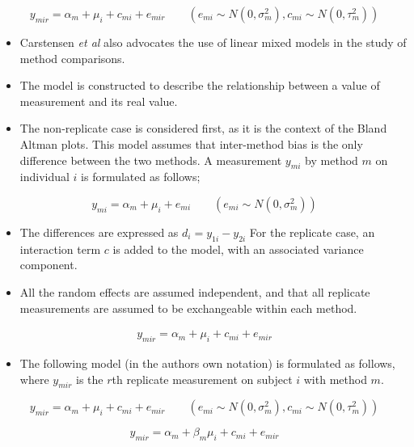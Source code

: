 \documentclass{report}
\begin{document}
\begin{equation}
	y_{mir}  = \alpha_{m} + \mu_{i} + c_{mi} + e_{mir} \qquad ( e_{mi}
	\sim N(0,\sigma^{2}_{m}), c_{mi} \sim N(0,\tau^{2}_{m}))
\end{equation}


%
\large
\begin{itemize}
	\item Carstensen \textit{et al} \cite{BXC2004} also advocates the use of linear mixed models in
	the study of method comparisons. 
	\item The model is constructed to
	describe the relationship between a value of measurement and its
	real value.
	\item  The non-replicate case is considered first, as it is
	the context of the Bland Altman plots. This model assumes that
	inter-method bias is the only difference between the two methods.
	A measurement $y_{mi}$ by method $m$ on individual $i$ is
	formulated as follows;
\end{itemize}
\begin{equation}
	y_{mi}  = \alpha_{m} + \mu_{i} + e_{mi} \qquad ( e_{mi} \sim
	N(0,\sigma^{2}_{m}))
\end{equation}


%
\Large
\begin{itemize}
	\item The differences are expressed as $d_{i} = y_{1i} - y_{2i}$ For the
	replicate case, an interaction term $c$ is added to the model,
	with an associated variance component. 
	\item All the random effects are
	assumed independent, and that all replicate measurements are
	assumed to be exchangeable within each method.
\end{itemize}
\begin{eqnarray}
	y_{mir}  = \alpha_{m} + \mu_{i} + c_{mi} + e_{mir} 
\end{eqnarray}

%
\large
\begin{itemize}
	\item The following model (in the authors own notation) is
	formulated as follows, where $y_{mir}$ is the $r$th replicate
	measurement on subject $i$ with method $m$.
\end{itemize}
{

	\begin{equation}
		y_{mir}  = \alpha_{m} + \mu_{i} + c_{mi} + e_{mir} \qquad ( e_{mi}
		\sim N(0,\sigma^{2}_{m}), c_{mi} \sim N(0,\tau^{2}_{m}))
	\end{equation}
	
	
	\begin{equation}
		y_{mir}  = \alpha_{m} + \beta_{m}\mu_{i} + c_{mi} + e_{mir} 
	\end{equation}
}
\end{document}
